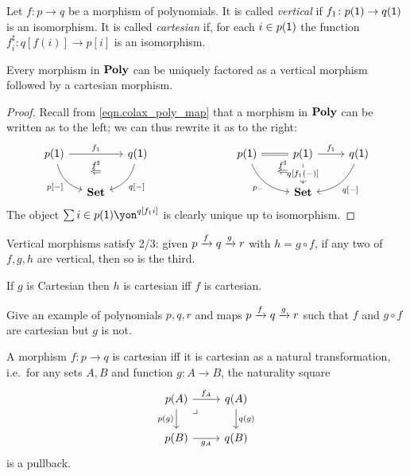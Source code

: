 \documentclass[Book-Poly]{subfiles}
\begin{document}
\begin{definition}
Let $f\colon p\to q$ be a morphism of polynomials. It is called \emph{vertical} if $f_1\colon p(\textsf{1})\to q(\textsf{1})$ is an isomorphism. It is called \emph{cartesian} if, for each $i\in p(\textsf{1})$ the function $f^\sharp_i\colon q[f(i)]\to p[i]$ is an isomorphism.
\end{definition}

\begin{proposition}\label{prop.vert_cart_factorization}
Every morphism in $\textbf{Poly}$ can be uniquely factored as a vertical morphism followed by a cartesian morphism.
\end{proposition}
\begin{proof}
Recall from \cref{eqn.colax_poly_map} that a morphism in $\textbf{Poly}$ can be written as to the left; we can thus rewrite it as to the right:
\[
\begin{tikzcd}[column sep=small]
	p(\1)\ar[dr, bend right, "{p[-]}"']\ar[rr, "f_1"]&~&
	q(\1)\ar[dl, bend left, "{q[-]}"]\\&
	\smset\ar[u, phantom, near end, "\overset{f^\sharp}{\Leftarrow}"]
\end{tikzcd}
\hspace{1in}
\begin{tikzcd}
	p(\1)\ar[dr, bend right, "p_-"']\ar[r, equal, ""' name=equal]&
	p(\1)\ar[d, "{q[f_1(-)]}" description]\ar[r, "f_1"]&
	q(\1)\ar[dl, bend left, "{q[-]}"]\\&
	|[alias=set]|\smset\ar[from=equal, to=set, pos=.3, phantom, "\overset{f^\sharp}{\Leftarrow}"]
\end{tikzcd}
\]
The object $\sum{i\in p(\1)}\yon^{q[f_1i]}$ is clearly unique up to isomorphism.
\end{proof}

\begin{proposition}
Vertical morphisms satisfy 2/3: given $p\xrightarrow{f}q\xrightarrow{g}r$ with $h=g\circ f$, if any two of $f,g,h$ are vertical, then so is the third.

If $g$ is Cartesian then $h$ is cartesian iff $f$ is cartesian.
\end{proposition}

\begin{exercise}
Give an example of polynomials $p,q,r$ and maps $p\xrightarrow{f}q\xrightarrow{g}r$ such that $f$ and $g\circ f$ are cartesian but $g$ is not.
\end{exercise}

\begin{proposition}\label{prop.cart_as_nt}
A morphism $f\colon p\to q$ is cartesian iff it is cartesian as a natural transformation, i.e.\ for any sets $A,B$ and function $g\colon A\to B$, the naturality square
\[
\begin{tikzcd}
	p(A)\ar[r, "f_A"]\ar[d, "p(g)"']&
	q(A)\ar[d, "q(g)"]\\
	p(B)\ar[r, "g_A"']&
	q(B)\ar[ul, phantom, very near end, "\lrcorner"]
\end{tikzcd}
\]
is a pullback.
\end{proposition}
\end{document}
